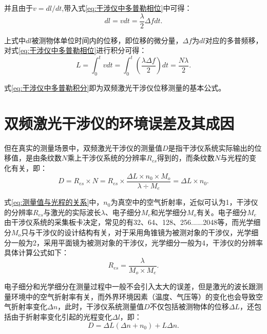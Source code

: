 并且由于\(v=dl / dt\),带入式\eqref{eq:干涉仪中多普勒相位}中可得：
\begin{equation}\label{eq:干涉仪中多普勒位移微分}
  dl = vdt = \frac{\lambda}{2}\Delta f dt.
\end{equation}

上式中\(dl\)被测物体单位时间内的位移，即位移的微分量，\(\Delta f\)为\(dl\)对应的多普频移，对式\eqref{eq:干涉仪中多普勒相位}进行积分可得：
\begin{equation}\label{eq:干涉仪中多普勒积分}
  L = \int_{0}^{t} vdt =\int_{0}^{t} (\frac{\lambda \Delta f}{2})dt = \frac{N\lambda}{2}.
\end{equation}

式\eqref{eq:干涉仪中多普勒积分}即为双频激光干涉仪位移测量的基本公式\cite{丁子婷双频激光干涉仪测量系统的环境误差研究}。

\section{双频激光干涉仪的环境误差及其成因}
但在真实的测量场景中，双频激光干涉仪的测量值\(D\)是指干涉仪系统实际输出的位移值，是由条纹数\(N\)乘上干涉仪系统的分辨率\(R_{es}\)得到的，而条纹数\(N\)与光程的变化有关，即：
\begin{equation}\label{eq:测量值与光程的关系}
    D=R_{es}{\times}N=R_{es}{\times}\frac{\Delta L{\times}n_0{\times}M_o}{\lambda{\div}M_e}=\Delta L{\times}n_0.
\end{equation}

式\eqref{eq:测量值与光程的关系}中，\(n_0\)为真空中的空气折射率，近似可认为1，干涉仪的分辨率\(R_{es}\)与激光的实际波长\(\lambda\)、电子细分\(M_e\)和光学细分\(M_o\)有关。电子细分\(M_e\)由干涉仪系统的采集板卡决定，常见的有32、64、128、256......2048等，而光学细分\(M_o\)只与干涉仪的设计结构有关，对于采用角锥镜为被测对象的干涉仪，光学细分一般为2，采用平面镜为被测对象的干涉仪，光学细分一般为4，干涉仪的分辨率具体计算公式如下：
\begin{equation}\label{eq:分辨率与细分的关系}
    R_{es}=\frac{\lambda}{M_o{\times}M_e}.
\end{equation}

电子细分和光学细分在测量过程中一般不会引入太大的误差，但是激光的波长跟测量环境中的空气折射率有关，而外界环境因素（温度、气压等）的变化也会导致空气折射率变化\(\Delta n\)，此时，干涉仪系统测量值\(D\)不仅包括被测物体的位移\(\Delta L\)，还包括由于折射率变化引起的光程变化\(\Delta l\)，即：
\begin{equation}\label{eq:实际的位移公式}
    D=\Delta L(\Delta n+n_0)+L\Delta n.
\end{equation}

